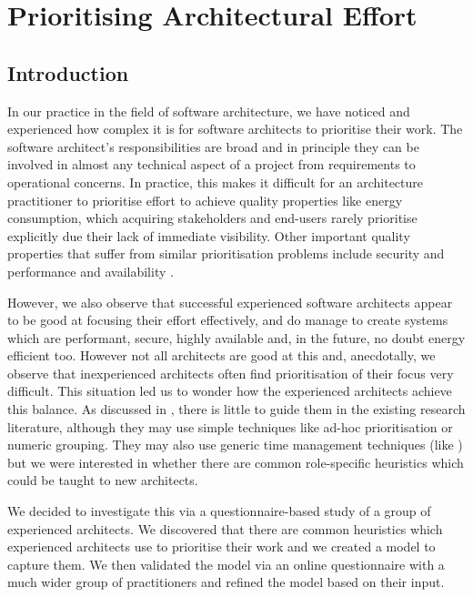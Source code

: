 \chapter{Prioritising Architectural Effort}
\label{chapter:prioritisation}

\section{Introduction}

In our practice in the field of software architecture, we have noticed and experienced how complex it is for software architects to prioritise their work.  The software architect's responsibilities are broad and in principle they can be involved in almost any technical aspect of a project from requirements to operational concerns.  In practice, this makes it difficult for an architecture practitioner to prioritise effort to achieve quality properties like energy consumption, which acquiring stakeholders and end-users rarely prioritise explicitly due their lack of immediate visibility.  Other important quality properties that suffer from similar prioritisation problems include security \cite{cisco2016-uksecprioritisation} and performance and availability \cite{ozkaya2008-qualityproperties}. 

However, we also observe that successful experienced software architects appear to be good at focusing their effort effectively, and do manage to create systems which are performant, secure, highly available and, in the future, no doubt energy efficient too. However not all architects are good at this and, anecdotally, we observe that inexperienced architects often find prioritisation of their focus very difficult.  This situation led us to wonder how the experienced architects achieve this balance.  As discussed in , there is little to guide them in the existing research literature, although they may use simple techniques like ad-hoc prioritisation or numeric grouping.  They may also use generic time management techniques (like \cite{allen2015-gettingthingsdone}) but we were interested in whether there are common role-specific heuristics which could be taught to new architects.

We decided to investigate this via a questionnaire-based study of a group of experienced architects.  We discovered that there are common heuristics which experienced architects use to prioritise their work and we created a model to capture them.  We then validated the model via an online questionnaire with a much wider group of practitioners and refined the model based on their input.

